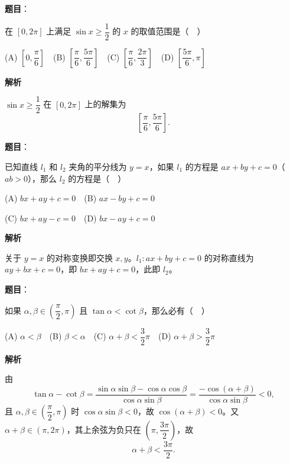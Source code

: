 \begin{answer}

\textbf{题目}：

在 \([0,2\pi]\) 上满足 \(\sin x\geqslant\dfrac{1}{2}\) 的 \(x\) 的取值范围是（　）

(A) \(\left[0,\dfrac{\pi}{6}\right]\)　(B) \(\left[\dfrac{\pi}{6},\dfrac{5\pi}{6}\right]\)　(C) \(\left[\dfrac{\pi}{6},\dfrac{2\pi}{3}\right]\)　(D) \(\left[\dfrac{5\pi}{6},\pi\right]\)

\textbf{解析}

\(\sin x\geqslant\dfrac12\) 在 \([0,2\pi]\) 上的解集为
\nopagebreak[4]
\[
\left[\frac{\pi}{6},\frac{5\pi}{6}\right].
\]


\end{answer}
\begin{answer}

\textbf{题目}：

已知直线 \(l_1\) 和 \(l_2\) 夹角的平分线为 \(y=x\)，如果 \(l_1\) 的方程是 \(ax+by+c=0\)（\(ab>0\)），那么 \(l_2\) 的方程是（　）

(A) \(bx+ay+c=0\)　(B) \(ax-by+c=0\)

(C) \(bx+ay-c=0\)　(D) \(bx-ay+c=0\)

\textbf{解析}

关于 \(y=x\) 的对称变换即交换 \(x,y\)。\(l_1:ax+by+c=0\) 的对称直线为 \(ay+bx+c=0\)，即 \(bx+ay+c=0\)，此即 \(l_2\)。


\end{answer}
\begin{answer}

\textbf{题目}：

如果 \(\alpha,\beta\in\left(\dfrac{\pi}{2},\pi\right)\) 且 \(\tan\alpha<\cot\beta\)，那么必有（　）

(A) \(\alpha<\beta\)　(B) \(\beta<\alpha\)　(C) \(\alpha+\beta<\dfrac{3}{2}\pi\)　(D) \(\alpha+\beta>\dfrac{3}{2}\pi\)

\textbf{解析}

由
\nopagebreak[4]
\[
\tan\alpha-\cot\beta
=\frac{\sin\alpha\sin\beta-\cos\alpha\cos\beta}{\cos\alpha\sin\beta}
=\frac{-\cos(\alpha+\beta)}{\cos\alpha\sin\beta}<0,
\]
且 \(\alpha,\beta\in\left(\dfrac{\pi}{2},\pi\right)\) 时 \(\cos\alpha\sin\beta<0\)，故 \(\cos(\alpha+\beta)<0\)。又 \(\alpha+\beta\in(\pi,2\pi)\)，其上余弦为负只在 \(\left(\pi,\dfrac{3\pi}{2}\right)\)，故
\nopagebreak[4]
\[
\alpha+\beta<\frac{3\pi}{2}.
\]


\end{answer}
